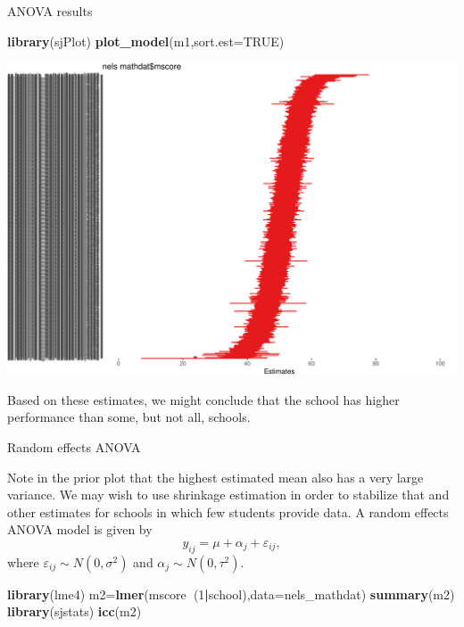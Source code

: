 \documentclass[ignorenonframetext,]{beamer}
\newenvironment{Shaded}{\begin{snugshade}}{\end{snugshade}}
\newcommand{\KeywordTok}[1]{\textcolor[rgb]{0.13,0.29,0.53}{\textbf{#1}}}
\newcommand{\DataTypeTok}[1]{\textcolor[rgb]{0.13,0.29,0.53}{#1}}
\newcommand{\DecValTok}[1]{\textcolor[rgb]{0.00,0.00,0.81}{#1}}
\newcommand{\OtherTok}[1]{\textcolor[rgb]{0.56,0.35,0.01}{#1}}
\newcommand{\OperatorTok}[1]{\textcolor[rgb]{0.81,0.36,0.00}{\textbf{#1}}}
\newcommand{\NormalTok}[1]{#1}
\begin{document}
\begin{frame}[fragile]{ANOVA results}

\begin{Shaded}
\begin{Highlighting}[]
\KeywordTok{library}\NormalTok{(sjPlot)}
\KeywordTok{plot_model}\NormalTok{(m1,}\DataTypeTok{sort.est=}\OtherTok{TRUE}\NormalTok{)}
\end{Highlighting}
\end{Shaded}

\end{frame}

\begin{frame}{}

\includegraphics{ancova_01_deck_files/figure-beamer/catplot1-1.pdf}

Based on these estimates, we might conclude that the school has higher
performance than some, but not all, schools.

\end{frame}

\begin{frame}[fragile]{Random effects ANOVA}

Note in the prior plot that the highest estimated mean also has a very
large variance. We may wish to use shrinkage estimation in order to
stabilize that and other estimates for schools in which few students
provide data. A random effects ANOVA model is given by
\[y_{ij}=\mu+\alpha_j+\varepsilon_{ij},\] where
\(\varepsilon_{ij} \sim N(0,\sigma^2)\) and
\(\alpha_j \sim N(0,\tau^2)\).

\begin{Shaded}
\begin{Highlighting}[]
\KeywordTok{library}\NormalTok{(lme4)}
\NormalTok{m2=}\KeywordTok{lmer}\NormalTok{(mscore}\OperatorTok{~}\NormalTok{(}\DecValTok{1}\OperatorTok{|}\NormalTok{school),}\DataTypeTok{data=}\NormalTok{nels_mathdat)}
\KeywordTok{summary}\NormalTok{(m2)}
\KeywordTok{library}\NormalTok{(sjstats)}
\KeywordTok{icc}\NormalTok{(m2)}
\end{Highlighting}
\end{Shaded}

\end{frame}
\end{document}
